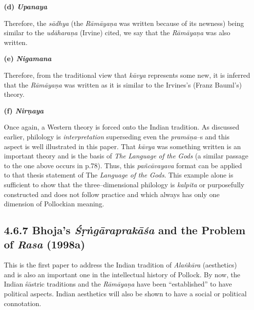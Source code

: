 \textbf{(d) \textit{Upanaya}}

Therefore, the \textit{sādhya} (the \textit{Rāmāyaṇa} was written because of its newness) being similar to the \textit{udāharaṇa} (Irvine) cited, we say that the \textit{Rāmāyaṇa} was also written.

\textbf{(e) \textit{Nigamana}}

Therefore, from the traditional view that \textit{kāvya} represents some new, it is inferred that the \textit{Rāmāyaṇa }was written as it is similar to the Irvines’s (Franz Bauml’s) theory.

\textbf{(f) \textit{Nirṇaya}}

Once again, a Western theory is forced onto the Indian tradition. As discussed earlier, philology is \textit{interpretation} superseding even the \textit{pramāṇa}–s and this aspect is well illustrated in this paper. That \textit{kāvya} was something written is an important theory and is the basis of \textit{The Language of the Gods} (a similar passage to the one above occurs in p.78). Thus, this \textit{pañcāvayava} format can be applied to that thesis statement of The\textit{ Language of the Gods}. This example alone is sufficient to show that the three–dimensional philology is \textit{kalpita} or purposefully constructed and does not follow practice and which always has only one dimension of Pollockian meaning.

\vspace{-.5cm}

\subsection*{4.6.7 Bhoja's {\it {\bfseries Śṛṅgāraprakāśa}} and the Problem of {\it {\bfseries Rasa}} (1998a)}

This is the first paper to address the Indian tradition of \textit{Alaṅkāra} (aesthetics) and is also an important one in the intellectual history of Pollock. By now, the Indian śāstric traditions and the \textit{Rāmāyaṇa} have been “established” to have political aspects. Indian aesthetics will also be shown to have a social or political connotation.

